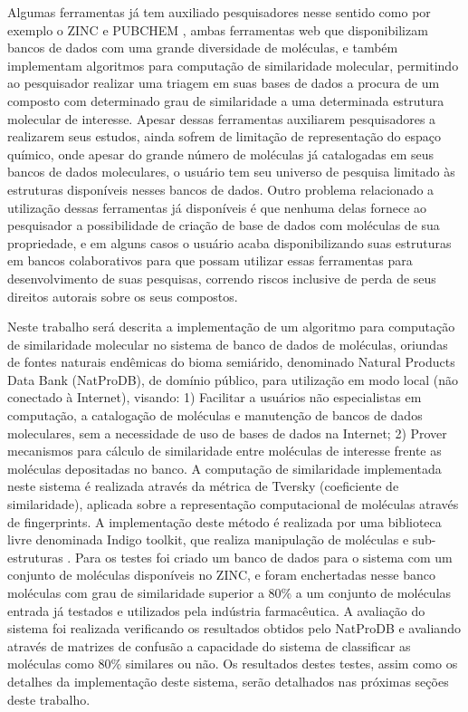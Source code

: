 Algumas ferramentas já tem auxiliado pesquisadores nesse sentido como por exemplo o ZINC \cite{irwin2005zinc} e PUBCHEM \cite{li2010pubchem}, ambas ferramentas web que disponibilizam bancos de dados com uma grande diversidade de moléculas, e também implementam algoritmos para computação de similaridade molecular, permitindo ao pesquisador realizar uma triagem em suas bases de dados a procura de um composto com determinado grau de similaridade a uma determinada estrutura molecular de interesse. Apesar dessas ferramentas auxiliarem pesquisadores a realizarem seus estudos, ainda sofrem de limitação de representação do espaço químico, onde apesar do grande número de moléculas já catalogadas em seus bancos de dados moleculares, o usuário tem seu universo de pesquisa limitado às estruturas disponíveis nesses bancos de dados. Outro problema relacionado a utilização dessas ferramentas já disponíveis é que nenhuma delas fornece ao pesquisador a possibilidade de criação de base de dados com moléculas de sua propriedade, e em alguns casos o usuário acaba disponibilizando suas estruturas em bancos colaborativos para que possam utilizar essas ferramentas para desenvolvimento de suas pesquisas, correndo riscos inclusive de perda de seus direitos autorais sobre os  seus compostos.

Neste trabalho será descrita a implementação de um algoritmo para computação de similaridade molecular no sistema de banco de dados de moléculas, oriundas de fontes naturais endêmicas do bioma semiárido, denominado Natural Products Data Bank (NatProDB), de domínio público, para utilização em modo local (não conectado à Internet), visando: 1) Facilitar a usuários não especialistas em computação, a catalogação de moléculas e manutenção de bancos de dados moleculares, sem a necessidade de uso de bases de dados na Internet; 2) Prover mecanismos para cálculo de similaridade entre moléculas de interesse frente as moléculas depositadas no banco. A computação de similaridade implementada neste sistema é realizada através da métrica de Tversky (coeficiente de similaridade), aplicada sobre a representação computacional de moléculas através de fingerprints. A implementação deste método é realizada por uma biblioteca livre denominada Indigo toolkit, que realiza manipulação de moléculas e sub-estruturas \cite{pavlov2011indigo}. Para os testes foi criado um banco de dados para o sistema com um conjunto de moléculas disponíveis no ZINC, e foram enchertadas nesse banco moléculas com grau de similaridade superior a 80\% a um conjunto de moléculas entrada já testados e utilizados pela indústria farmacêutica. A avaliação do sistema foi realizada verificando os resultados obtidos pelo NatProDB e avaliando através de matrizes de confusão a capacidade do sistema de classificar as moléculas como 80\% similares ou não. Os resultados destes testes, assim como os detalhes da implementação deste sistema, serão detalhados nas próximas seções deste trabalho.
                  

